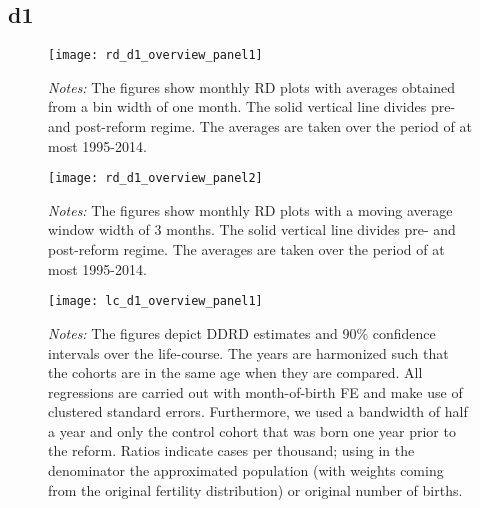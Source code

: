 \subsection{d1}
\begin{landscape}
\begin{figure}[H]
	\centering
	\begin{minipage}{.95\linewidth}
	\texttt{[image: rd\_d1\_overview\_panel1]}
	{\scriptsize \emph{Notes:} The figures show monthly RD plots with averages obtained from a bin width of one month. The solid vertical line divides pre- and post-reform regime. The averages are taken over the period of at most 1995-2014. \par}
\end{minipage}
\end{figure}
\end{landscape}
\begin{landscape}
\begin{figure}[H]
	\centering
\begin{minipage}{.95\linewidth}
	\texttt{[image: rd\_d1\_overview\_panel2]}
	{\scriptsize \emph{Notes:} The figures show monthly RD plots with a moving average window width of 3 months. The solid vertical line divides pre- and post-reform regime. The averages are taken over the period of at most 1995-2014. \par}
\end{minipage}
\end{figure}
\end{landscape}


\begin{landscape}
\begin{figure}[H]
\centering
\begin{minipage}{.9\linewidth}
\texttt{[image: lc\_d1\_overview\_panel1]}
{\scriptsize \emph{Notes:} The figures depict DDRD estimates and 90\% confidence intervals over the life-course. The years are harmonized such that the cohorts are in the same age when they are compared. All regressions are carried out with month-of-birth FE and make use of clustered standard errors. Furthermore, we used a bandwidth of half a year and only the control cohort that was born one year prior to the reform. Ratios indicate cases per thousand; using in the denominator the approximated population (with weights coming from the original fertility distribution) or original number of births. \par}
\end{minipage}
\end{figure}
\end{landscape}
